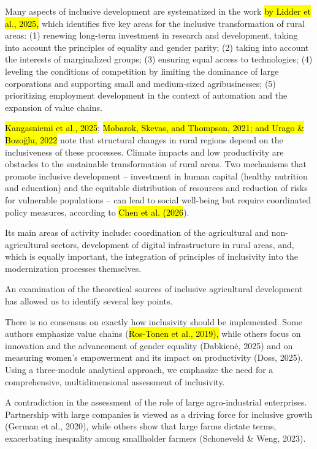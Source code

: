 Many aspects of inclusive development are systematized in the work
\hl{by Lidder et al., 2025,} which identifies five key areas for the
inclusive transformation of rural areas: (1) renewing long-term
investment in research and development, taking into account the
principles of equality and gender parity; (2) taking into account the
interests of marginalized groups; (3) ensuring equal access to
technologies; (4) leveling the conditions of competition by limiting the
dominance of large corporations and supporting small and medium-sized
agribusinesses; (5) prioritizing employment development in the context
of automation and the expansion of value chains.

\hl{Kangasniemi et al., 2025}; \hl{Mobarok, Skevas, and Thompson, 2021;
and Urago \& Bozoğlu, 2022} note that structural changes in rural
regions depend on the inclusiveness of these processes. Climate impacts
and low productivity are obstacles to the sustainable transformation of
rural areas. Two mechanisms that promote inclusive development --
investment in human capital (healthy nutrition and education) and the
equitable distribution of resources and reduction of risks for
vulnerable populations -- can lead to social well-being but require
coordinated policy measures, according to \hl{Chen et al. (2026}).

Its main areas of activity include: coordination of the agricultural and
non-agricultural sectors, development of digital infrastructure in rural
areas, and, which is equally important, the integration of principles of
inclusivity into the modernization processes themselves.

An examination of the theoretical sources of inclusive agricultural
development has allowed us to identify several key points.

There is no consensus on exactly how inclusivity should be implemented.
Some authors emphasize value chains (\hl{Ros-Tonen et al., 2019),} while
others focus on innovation and the advancement of gender equality
(Dabkienė, 2025) and on measuring women's empowerment and its impact on
productivity (Doss, 2025). Using a three-module analytical approach, we
emphasize the need for a comprehensive, multidimensional assessment of
inclusivity.

A contradiction in the assessment of the role of large agro-industrial
enterprises. Partnership with large companies is viewed as a driving
force for inclusive growth (German et al., 2020), while others show that
large farms dictate terms, exacerbating inequality among smallholder
farmers (Schoneveld \& Weng, 2023).

